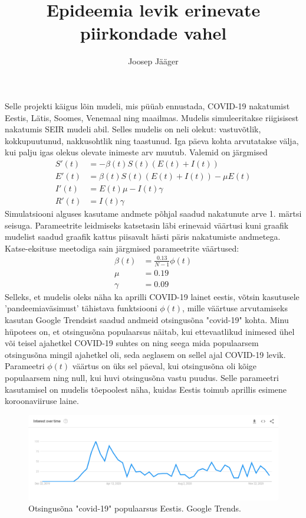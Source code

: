 \documentclass[a4paper]{article}
\title{Epideemia levik erinevate piirkondade vahel}
\author{Joosep Jääger}
\begin{document}
  \maketitle
  Selle projekti käigus lõin mudeli, mis püüab ennustada, COVID-19 nakatumist
  Eestis, Lätis, Soomes, Venemaal ning maailmas. Mudelis simuleeritakse riigisisest
  nakatumis SEIR mudeli abil. Selles mudelis on neli olekut: vastuvõtlik, kokkupuutunud,
  nakkusohtlik ning taastunud. Iga päeva kohta arvutatakse välja, kui palju igas
  olekus olevate inimeste arv muutub. Valemid on järgmised
  \begin{align}
    S'(t)&=-\beta(t) S(t)(E(t)+I(t))\\
    E'(t)&=\beta(t) S(t)(E(t)+I(t))-\mu E(t)\\
    I'(t)&=E(t)\mu-I(t)\gamma\\
    R'(t)&=I(t)\gamma
  \end{align}
  Simulatsiooni alguses kasutame andmete põhjal saadud nakatunute arve 1. märtsi
  seisuga. Parameetrite leidmiseks katsetasin läbi erinevaid väärtusi kuni graafik
  mudelist saadud graafik kattus piisavalt hästi päris nakatumiste andmetega.
  Katse-eksituse meetodiga sain järgmised parameetrite väärtused:
  \begin{align}
    \beta(t)&=\frac{0.13}{N-1}\phi(t) \\
    \mu&=0.19 \\
    \gamma&=0.09
  \end{align}
  Selleks, et mudelis oleks näha ka aprilli COVID-19 lainet eestis, võtsin kasutusele
  'pandeemiaväsimust' tähistava funktsiooni $\phi(t)$, mille väärtuse arvutamiseks
  kasutan Google Trendsist saadud andmeid otsingusõna "covid-19" kohta. Minu hüpotees on,
  et otsingusõna populaarsus näitab, kui ettevaatlikud inimesed ühel või teisel ajahetkel
  COVID-19 suhtes on ning seega mida populaarsem otsingusõna mingil ajahetkel oli,
  seda aeglasem on sellel ajal COVID-19 levik. Parameetri $\phi(t)$ väärtus on üks sel päeval,
  kui otsingusõna oli kõige populaarsem ning null, kui huvi otsingusõna vastu puudus.
  Selle parameetri kasutamisel on mudelis tõepoolest näha, kuidas Eestis toimub aprillis
  esimene koroonaviiruse laine.
  \begin{figure}
    \centering
    \includegraphics[width=\textwidth]{graphics/trends.png}
    \caption{Otsingusõna "covid-19" populaarsus Eestis. Google Trends.}
  \end{figure}
\end{document}
